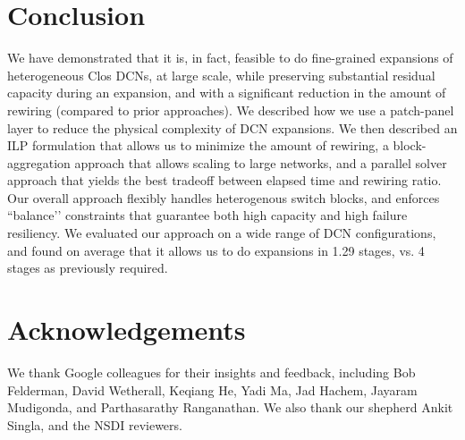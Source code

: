 \documentclass[letterpaper,twocolumn,10pt]{article}
\begin{document}
\section{Conclusion}
We have demonstrated that it is, in fact, feasible to do fine-grained expansions of heterogeneous Clos DCNs, at large scale, while preserving substantial residual capacity during an expansion, and with a significant reduction in the amount of rewiring (compared to prior approaches).  We described how we use a patch-panel layer to reduce the physical complexity of DCN expansions.  We then described an ILP formulation that allows us to minimize the amount of rewiring, a block-aggregation approach that allows scaling to large networks, and a parallel solver approach that yields the best tradeoff between elapsed time and rewiring ratio.   Our overall approach flexibly handles heterogenous switch blocks, and enforces ``balance’’ constraints that guarantee both high capacity and high failure resiliency. We evaluated our approach on a wide range of DCN configurations, and found on average that it allows us to do expansions in 1.29 stages, vs. 4 stages as previously required.

\section{Acknowledgements}
We thank Google colleagues for their insights and feedback, including Bob Felderman, David Wetherall, Keqiang He, Yadi Ma, Jad Hachem, Jayaram Mudigonda, and Parthasarathy Ranganathan. We also thank our shepherd Ankit Singla, and the NSDI reviewers.

\newpage



\end{document}
